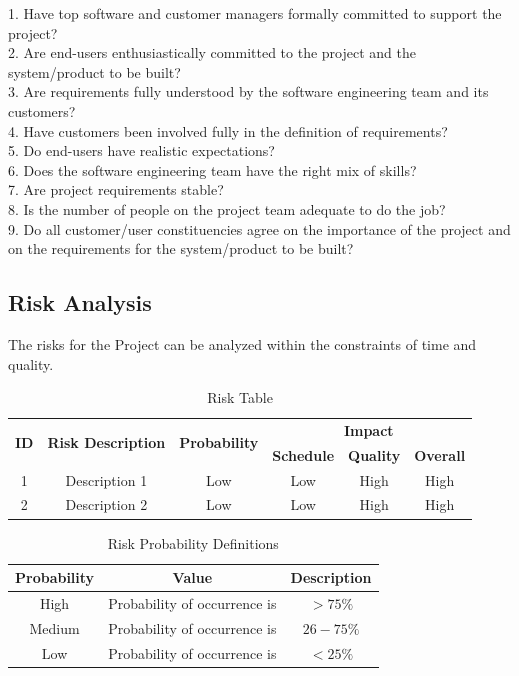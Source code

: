 \documentclass{report} %
\begin{document}
			1. Have top software and customer managers formally committed to support the
			project? \\
			2. Are end-users enthusiastically committed to the project and the system/product
			to be built? \\
			3. Are requirements fully understood by the software engineering team and its
			customers? \\
			4. Have customers been involved fully in the definition of requirements? \\
			5. Do end-users have realistic expectations? \\
			6. Does the software engineering team have the right mix of skills? \\
			7. Are project requirements stable? \\
			8. Is the number of people on the project team adequate to do the job? \\
			9. Do all customer/user constituencies agree on the importance of the project and
			on the requirements for the system/product to be built? \\
			
			\subsection{Risk Analysis}
			The risks for the Project can be analyzed within the constraints of time and quality. \\
			
			\begin{table}[H]
				\centering
				\renewcommand{\arraystretch}{1.5}
				\begin{tabular}{|c|c|c|c|c|c|}
					\hline
					\multirow{2}{*}{\textbf{ID}} & \multirow{2}{*}{\textbf{Risk Description}} & \multirow{2}{*}{\textbf{Probability}} & \multicolumn{3}{c|}{\textbf{\textbf{Impact}}} \\
					\cline{4-6}
					 &  &  & \textbf{Schedule} & \textbf{Quality} & \textbf{Overall} \\
					\hline
					1 & Description 1 & Low & Low & High & High \\
					\hline
					2 & Description 2 & Low & Low & High & High \\
					\hline
				\end{tabular}
				\caption{Risk Table}
			\end{table}
			
			\begin{table}[H]
				\centering
				\renewcommand{\arraystretch}{1.5}
				\begin{tabular}{|c|c|c|}
					\hline
					\textbf{Probability} & \textbf{Value} & \textbf{Description} \\
					\hline
					High & Probability of occurrence is & $ > 75 \% $ \\
					\hline
					Medium & Probability of occurrence is & $ 26 - 75\% $ \\
					\hline
					Low & Probability of occurrence is & $ <25\% $ \\
					\hline
				\end{tabular}
				\caption{Risk Probability Definitions}
			\end{table}
			
\end{document}

